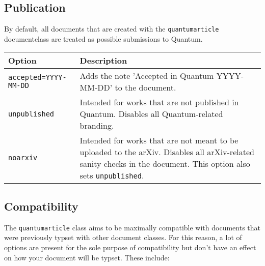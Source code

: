 \documentclass[a4paper,noarxiv,onecolumn]{quantumarticle}
\newenvironment{options}
	{\medskip\noindent\begin{longtable}{p{.20\columnwidth}p{.744\columnwidth}}
	\textsf{Option} & \textsf{Description} \\
	\midrule
	}
	{\bottomrule\end{longtable}}
\newcommand{\option}[2]{
	\small\texttt{#1} & {\small#2} \\
}
\begin{document}
	\subsection{Publication}
	By default, all documents that are created with the \texttt{quantumarticle} documentclass are treated as possible submissions to Quantum. 
	
	\begin{options}
		\option{accepted=YYYY-MM-DD}{
			Adds the note 'Accepted in Quantum YYYY-MM-DD' to the document.
		}
		\option{unpublished}{
			Intended for works that are not published in Quantum. Disables all Quantum-related branding.
		}
		\option{noarxiv}{
			Intended for works that are not meant to be uploaded to the arXiv. Disables all arXiv-related sanity checks in the document. This option also sets \texttt{unpublished}.
		}
	\end{options}

	\subsection{Compatibility}
	The \texttt{quantumarticle} class aims to be maximally compatible with documents that were previously typset with other document classes. For this reason, a lot of options are present for the sole purpose of compatibility but don't have an effect on how your document will be typset. These include:
	
\end{document}
